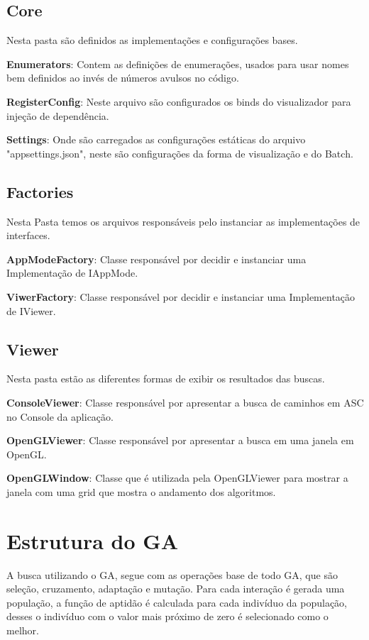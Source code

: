 \subsection{Core}

Nesta pasta são definidos as implementações e configurações bases.

\textbf{Enumerators}: Contem as definições de enumerações, usados para usar nomes bem definidos ao invés de números avulsos no código.

\textbf{RegisterConfig}: Neste arquivo são configurados os binds do visualizador para injeção de dependência.

\textbf{Settings}: Onde são carregados as configurações estáticas do arquivo "appsettings.json", neste são configurações da forma de visualização e do Batch.

\subsection{Factories}

Nesta Pasta temos os arquivos responsáveis pelo instanciar as implementações de interfaces.

\textbf{AppModeFactory}: Classe responsável por decidir e instanciar uma Implementação de IAppMode.

\textbf{ViwerFactory}: Classe responsável por decidir e instanciar uma Implementação de IViewer.

\subsection{Viewer}

Nesta pasta estão as diferentes formas de exibir os resultados das buscas.

\textbf{ConsoleViewer}: Classe responsável por apresentar a busca de caminhos em ASC no Console da aplicação.

\textbf{OpenGLViewer}: Classe responsável por apresentar a busca em uma janela em OpenGL.

\textbf{OpenGLWindow}: Classe que é utilizada pela OpenGLViewer para mostrar a janela com uma grid que mostra o andamento dos algoritmos.

\section{Estrutura do GA}

A busca utilizando o GA, segue com as operações base de todo GA, que são seleção, cruzamento, adaptação e mutação. 
Para cada interação é gerada uma população, a função de aptidão é calculada para cada indivíduo da população, 
desses o indivíduo com o valor mais próximo de zero é selecionado como o melhor.

